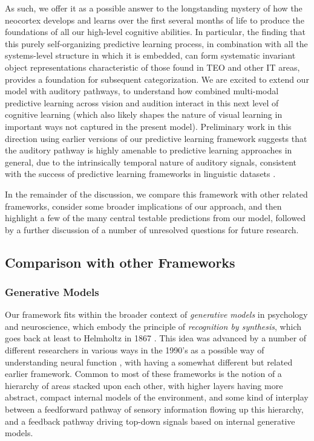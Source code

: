 \documentclass[11pt,twoside]{article}
\newif\myifpdf
\begin{document}
As such, we offer it as a possible answer to the longstanding mystery of how the neocortex develops and learns over the first several months of life to produce the foundations of all our high-level cognitive abilities.  In particular, the finding that this purely self-organizing predictive learning process, in combination with all the systems-level structure in which it is embedded, can form systematic invariant object representations characteristic of those found in TEO and other IT areas, provides a foundation for subsequent categorization.  We are excited to extend our model with auditory pathways, to understand how combined multi-modal predictive learning across vision and audition interact in this next level of cognitive learning (which also likely shapes the nature of visual learning in important ways not captured in the present model).  Preliminary work in this direction using earlier versions of our predictive learning framework suggests that the auditory pathway is highly amenable to predictive learning approaches in general, due to the intrinsically temporal nature of auditory signals, consistent with the success of predictive learning frameworks in linguistic datasets \cite{Elman90,Elman91,MikolovSutskeverChenEtAl13}.

In the remainder of the discussion, we compare this framework with other related frameworks, consider some broader implications of our approach, and then highlight a few of the many central testable predictions from our model, followed by a further discussion of a number of unresolved questions for future research.

\subsection{Comparison with other Frameworks}

\subsubsection{Generative Models}

Our framework fits within the broader context of {\em generative models} in psychology and neuroscience, which embody the principle of {\em recognition by synthesis}, which goes back at least to Helmholtz in 1867 .  This idea was advanced by a number of different researchers in various ways in the 1990's as a possible way of understanding neural function \cite{Mumford92,KawatoHayakawaInui93,Ullman95,DayanHintonNealEtAl95,RaoBallard99}, with  having a somewhat different but related earlier framework.  Common to most of these frameworks is the notion of a hierarchy of areas stacked upon each other, with higher layers having more abstract, compact internal models of the environment, and some kind of interplay between a feedforward pathway of sensory information flowing up this hierarchy, and a feedback pathway driving top-down signals based on internal generative models.
\end{document}
